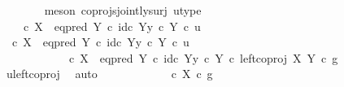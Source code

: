 \begin{isabellebody}
\ \ \ \ \ \ \isamarkupfalse%
\ {\isacharparenleft}{\kern0pt}meson\ coprojs{\isacharunderscore}{\kern0pt}jointly{\isacharunderscore}{\kern0pt}surj\ u{\isacharunderscore}{\kern0pt}type{\isacharparenright}{\kern0pt}\isanewline
\ \ \ \ \isamarkupfalse%
\ {\isachardoublequoteopen}{\isasymf}\ {\isacharequal}{\kern0pt}\ {\isacharparenleft}{\kern0pt}{\isasymf}\ {\isasymcirc}\isactrlsub c\ {\isasymbeta}\isactrlbsub X\isactrlesub {\isacharparenright}{\kern0pt}\ {\isasymamalg}\ {\isacharparenleft}{\kern0pt}eq{\isacharunderscore}{\kern0pt}pred\ Y\ {\isasymcirc}\isactrlsub c\ {\isasymlangle}id\isactrlsub c\ Y{\isacharcomma}{\kern0pt}y\ {\isasymcirc}\isactrlsub c\ {\isasymbeta}\isactrlbsub Y\isactrlesub {\isasymrangle}{\isacharparenright}{\kern0pt}\ {\isasymcirc}\isactrlsub c\ u{\isachardoublequoteclose}\isanewline
\ \ \ \ \isamarkupfalse%
\ {\isacharminus}{\kern0pt}\isanewline
\ \ \ \ \ \ \isamarkupfalse%
\ {\isachardoublequoteopen}{\isacharparenleft}{\kern0pt}{\isasymf}\ {\isasymcirc}\isactrlsub c\ {\isasymbeta}\isactrlbsub X\isactrlesub {\isacharparenright}{\kern0pt}\ {\isasymamalg}\ {\isacharparenleft}{\kern0pt}eq{\isacharunderscore}{\kern0pt}pred\ Y\ {\isasymcirc}\isactrlsub c\ {\isasymlangle}id\isactrlsub c\ Y{\isacharcomma}{\kern0pt}y\ {\isasymcirc}\isactrlsub c\ {\isasymbeta}\isactrlbsub Y\isactrlesub {\isasymrangle}{\isacharparenright}{\kern0pt}\ {\isasymcirc}\isactrlsub c\ u\isanewline
\ \ \ \ \ \ \ \ \ \ {\isacharequal}{\kern0pt}\ {\isacharparenleft}{\kern0pt}{\isasymf}\ {\isasymcirc}\isactrlsub c\ {\isasymbeta}\isactrlbsub X\isactrlesub {\isacharparenright}{\kern0pt}\ {\isasymamalg}\ {\isacharparenleft}{\kern0pt}eq{\isacharunderscore}{\kern0pt}pred\ Y\ {\isasymcirc}\isactrlsub c\ {\isasymlangle}id\isactrlsub c\ Y{\isacharcomma}{\kern0pt}y\ {\isasymcirc}\isactrlsub c\ {\isasymbeta}\isactrlbsub Y\isactrlesub {\isasymrangle}{\isacharparenright}{\kern0pt}\ {\isasymcirc}\isactrlsub c\ left{\isacharunderscore}{\kern0pt}coproj\ X\ Y\ {\isasymcirc}\isactrlsub c\ g{\isachardoublequoteclose}\isanewline
\ \ \ \ \ \ \ \ \isamarkupfalse%
\ u{\isacharunderscore}{\kern0pt}left{\isacharunderscore}{\kern0pt}coproj\ \isamarkupfalse%
\ auto\isanewline
\ \ \ \ \ \ \isamarkupfalse%
\ \isamarkupfalse%
\ {\isachardoublequoteopen}{\isachardot}{\kern0pt}{\isachardot}{\kern0pt}{\isachardot}{\kern0pt}\ {\isacharequal}{\kern0pt}\ {\isacharparenleft}{\kern0pt}{\isasymf}\ {\isasymcirc}\isactrlsub c\ {\isasymbeta}\isactrlbsub X\isactrlesub {\isacharparenright}{\kern0pt}\ {\isasymcirc}\isactrlsub c\ g{\isachardoublequoteclose}\isanewline

\end{isabellebody}
